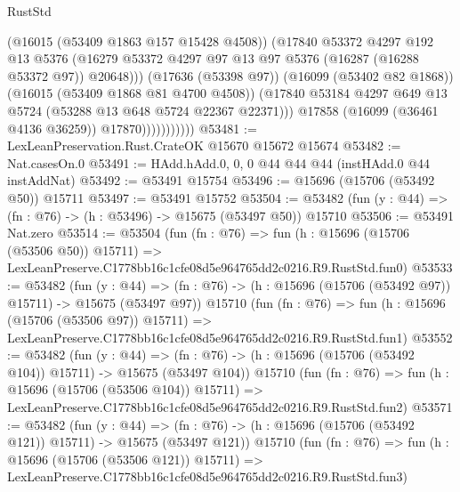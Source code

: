 \begin{lexlean}{RustStd}
\begin{coremodule}
                              (@16015 (@53409 @1863 @157 @15428 @4508))
                              (@17840
                                @53372
                                @4297
                                @192
                                @13
                                @5376
                                (@16279
                                  @53372
                                  @4297
                                  @97
                                  @13
                                  @97
                                  @5376
                                  (@16287 (@16288 @53372 @97))
                                  @20648)))
                            (@17636 (@53398 @97))
                            (@16099 (@53402 @82 @1868))
                            (@16015 (@53409 @1868 @81 @4700 @4508))
                            (@17840
                              @53184
                              @4297
                              @649
                              @13
                              @5724
                              (@53288 @13 @648 @5724 @22367 @22371)))
                          @17858
                          (@16099 (@36461 @4136 @36259))
                          @17870)))))))))))
@53481 := LexLeanPreservation.Rust.CrateOK @15670 @15672 @15674
@53482 := Nat.casesOn.{0}
@53491 := HAdd.hAdd.{0, 0, 0} @44 @44 @44 (instHAdd.{0} @44 instAddNat)
@53492 := @53491 @15754
@53496 := @15696 (@15706 (@53492 @50)) @15711
@53497 := @53491 @15752
@53504 := @53482 (fun (y : @44) => (fn : @76) -> (h : @53496) -> @15675 (@53497 @50)) @15710
@53506 := @53491 Nat.zero
@53514 := @53504
    (fun (fn : @76) =>
    fun (h : @15696 (@15706 (@53506 @50)) @15711) =>
    LexLeanPreserve.C1778bb16c1cfe08d5e964765dd2c0216.R9.RustStd.fun0)
@53533 := @53482
    (fun (y : @44) =>
    (fn : @76) -> (h : @15696 (@15706 (@53492 @97)) @15711) -> @15675 (@53497 @97))
    @15710
    (fun (fn : @76) =>
    fun (h : @15696 (@15706 (@53506 @97)) @15711) =>
    LexLeanPreserve.C1778bb16c1cfe08d5e964765dd2c0216.R9.RustStd.fun1)
@53552 := @53482
    (fun (y : @44) =>
    (fn : @76) -> (h : @15696 (@15706 (@53492 @104)) @15711) -> @15675 (@53497 @104))
    @15710
    (fun (fn : @76) =>
    fun (h : @15696 (@15706 (@53506 @104)) @15711) =>
    LexLeanPreserve.C1778bb16c1cfe08d5e964765dd2c0216.R9.RustStd.fun2)
@53571 := @53482
    (fun (y : @44) =>
    (fn : @76) -> (h : @15696 (@15706 (@53492 @121)) @15711) -> @15675 (@53497 @121))
    @15710
    (fun (fn : @76) =>
    fun (h : @15696 (@15706 (@53506 @121)) @15711) =>
    LexLeanPreserve.C1778bb16c1cfe08d5e964765dd2c0216.R9.RustStd.fun3)

\end{coremodule}
\end{lexlean}
